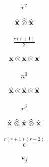 \documentclass[12 pt]{article}
\begin{document}
\begin{align*}
    r^2
\end{align*}

\begin{align*}
    \widehat{\mathbf{x}}\ \widehat{\otimes}\ \widehat{\mathbf{x}}
\end{align*}

\begin{align*}
    \frac{r(r+1)}{2}
\end{align*}

\begin{align*}
    \mathbf{x} \otimes \mathbf{x} \otimes \mathbf{x}
\end{align*}

\begin{align*}
    n^3
\end{align*}

\begin{align*}
    \widehat{\mathbf{x}} \otimes \widehat{\mathbf{x}} \otimes \widehat{\mathbf{x}}
\end{align*}

\begin{align*}
    r^3
\end{align*}

\begin{align*}
    \widehat{\mathbf{x}}\ \widehat{\otimes}\ \widehat{\mathbf{x}}\ \widehat{\otimes}\ \widehat{\mathbf{x}}
\end{align*}

\begin{align*}
    \frac{r(r+1)(r+2)}{6}
\end{align*}

\begin{align*}
    \mathbf{v}_j
\end{align*}

\end{document}
